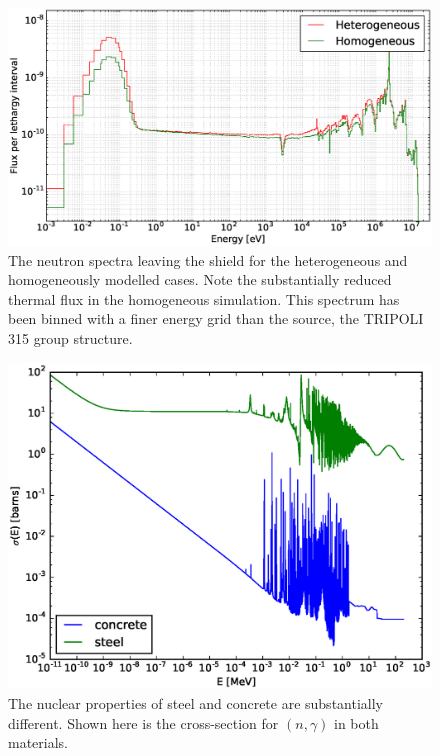 \begin{figure}[H]
  \includegraphics[width=\textwidth]{transmitted_neutron_spectra}
  \caption{The neutron spectra leaving the shield for the heterogeneous and homogeneously modelled cases. Note the substantially reduced thermal flux in the homogeneous simulation. This spectrum has been binned with a finer energy grid than the source, the TRIPOLI 315 group structure.}
  \label{fig:trans_neutron_spec}
\end{figure}

\begin{figure}[H]
  \includegraphics[width=\textwidth]{n_rad_capture}
  \caption{The nuclear properties of steel and concrete are substantially different. Shown here is the cross-section for $(n,\gamma)$ in both materials.}
  \label{fig:n_rad_capture}
\end{figure}

